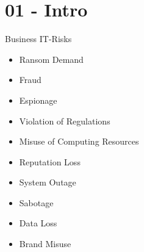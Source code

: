 \section{01 - Intro}

\begin{definition}{Business IT-Risks}
    \begin{itemize}
        \item Ransom Demand
        \item Fraud
        \item Espionage
        \item Violation of Regulations
        \item Misuse of Computing Resources
        \item Reputation Loss
        \item System Outage
        \item Sabotage
        \item Data Loss
        \item Brand Misuse
    \end{itemize}
\end{definition}

